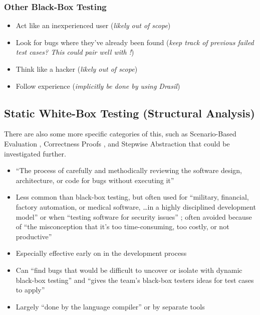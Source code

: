 \subsubsection{Other Black-Box Testing \cite[pp.~87-89]{patton_software_2006}}
\begin{itemize}
      \item Act like an inexperienced user (\emph{likely out of scope})
      \item Look for bugs where they've already been found (\emph{keep track of
                  previous failed test cases? This could pair well with
                  !})
      \item Think like a hacker (\emph{likely out of scope})
      \item Follow experience (\emph{implicitly be done by using Drasil})
\end{itemize}

\subsection{Static White-Box Testing (Structural Analysis)
      \cite[pp.~91-104]{patton_software_2006}}

There are also some more specific categories of this, such as Scenario-Based
Evaluation \cite[pp.~417-418]{van_vliet_software_2000}, Correctness Proofs
\cite[pp.~418-419]{van_vliet_software_2000}, and Stepwise Abstraction
\cite[pp.~419-420]{van_vliet_software_2000} that could be investigated further.

\begin{itemize}
      \item ``The process of carefully and methodically reviewing the software
            design, architecture, or code for bugs without executing it''
            \cite[p.~92]{patton_software_2006}
      \item Less common than black-box testing, but often used for ``military,
            financial, factory automation, or medical software, \dots in a
            highly disciplined development model'' or when ``testing software
            for security issues'' \cite[p.~91]{patton_software_2006}; often
            avoided because of ``the misconception that it's too
            time-consuming, too costly, or not productive''
            \cite[p.~92]{patton_software_2006}
      \item Especially effective early on in the development process
            \cite[p.~92]{patton_software_2006}
      \item Can ``find bugs that would be difficult to uncover or isolate with
            dynamic black-box testing'' and ``gives the team's black-box
            testers ideas for test cases to apply''
            \cite[p.~92]{patton_software_2006}
      \item Largely ``done by the language compiler'' or by separate tools
            \cite[pp.~413-414]{van_vliet_software_2000}
\end{itemize}

